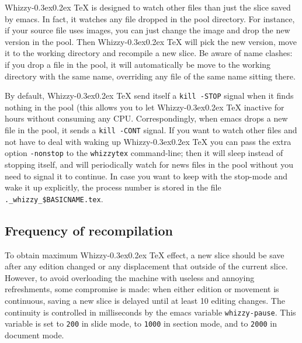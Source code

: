 \documentclass{article}
\let \lst \verb
\def \whizzy{{Whizzy\kern -0.3ex\raise 0.2ex \hbox{\TeX}}}
\begin{document}
{\whizzy} is designed to watch other files than just the slice saved by
emacs. In fact, it watches any file dropped in the pool directory. 
For instance, 
if your source file uses images, you can just change the image and
drop the new version in the pool. Then {\whizzy} will pick the new version,
move it to the working directory and recompile a new slice. Be aware of name
clashes: if you drop a file in the pool, it will automatically be move to
the working directory with the same name, overriding any file of the same
name sitting there. 

By default, {\whizzy} send itself a \lst"kill -STOP" signal when it finds
nothing in the pool (this allows you to let {\whizzy} inactive for hours
without consuming any CPU. Correspondingly, when emacs drops a new file in
the pool, it sends a \lst"kill -CONT" signal. If you want to watch other
files and not have to deal with waking up {\whizzy} you can pass the extra
option \lst"-nonstop" to the \lst"whizzytex" command-line; then it will sleep
instead of stopping itself, and will periodically watch for news files 
in the pool without you need to signal it to continue. 
In case you want to keep with the stop-mode and wake it up explicitly, the
process number is stored in the file \lst"._whizzy_$BASICNAME.tex".


\subsection {Frequency of recompilation} 

To obtain maximum {\whizzy} effect, a new slice should be save after any
edition changed or any displacement that outside of the current slice.
However, to avoid overloading the machine with useless and annoying
refreshments, some compromise is made: when either edition or movement
is continuous, saving a new slice is delayed until at least 10 editing
changes. The continuity is controlled in milliseconds by the emacs variable
\lst"whizzy-pause". This variable is set to \lst"200" in slide
mode, to \lst"1000" in section mode, and to \lst"2000" in document mode.
\end{document}
